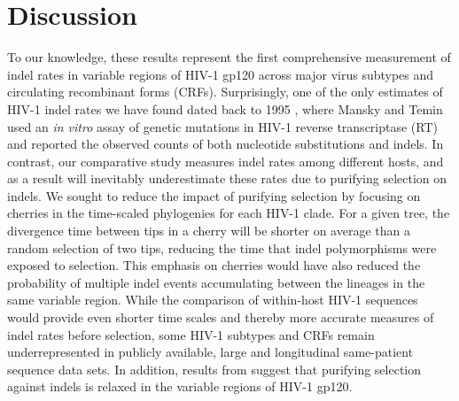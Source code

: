 \documentclass[12pt]{article}
\begin{document}
\section * {Discussion}

To our knowledge, these results represent the first comprehensive measurement of indel rates in variable regions of HIV-1 gp120 across major virus subtypes and circulating recombinant forms (CRFs).
Surprisingly, one of the only estimates of HIV-1 indel rates we have found dated back to 1995 \citep{Mansky:1995}, where Mansky and Temin used an \textit{in vitro} assay of genetic mutations in HIV-1 reverse transcriptase (RT) and reported the observed counts of both nucleotide substitutions and indels.
In contrast, our comparative study measures indel rates among different hosts, and as a result will inevitably underestimate these rates due to purifying selection on indels.
We sought to reduce the impact of purifying selection by focusing on cherries in the time-scaled phylogenies for each HIV-1 clade.
For a given tree, the divergence time between tips in a cherry will be shorter on average than a random selection of two tips, reducing the time that indel polymorphisms were exposed to selection.
This emphasis on cherries would have also reduced the probability of multiple indel events accumulating between the lineages in the same variable region.
While the comparison of within-host HIV-1 sequences would provide even shorter time scales and thereby more accurate measures of indel rates before selection, some HIV-1 subtypes and CRFs remain underrepresented in publicly available, large and longitudinal same-patient sequence data sets.
In addition, results from \citet{wood2009hiv} suggest that purifying selection against indels is relaxed in the variable regions of HIV-1 gp120.
\end{document}

